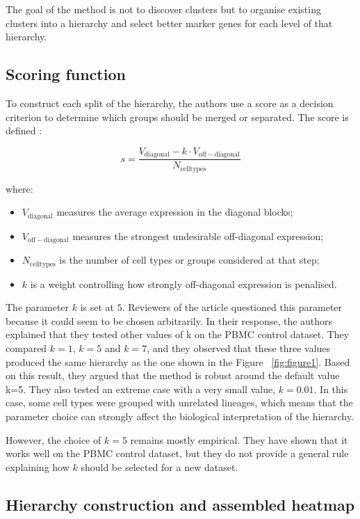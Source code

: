 \documentclass[11pt,a4paper]{article}
\begin{document}
The goal of the method is not to discover clusters but to organise existing clusters into a hierarchy and select better marker genes for each level of that hierarchy. 

\subsection{Scoring function} 

To construct each split of the hierarchy, the authors use a score as a decision criterion to determine which groups should be merged or separated. The score is defined :

\[
 s = \frac{V_{\mathrm{diagonal}} - k \cdot V_{\mathrm{off-diagonal}}}{N_{\mathrm{celltypes}}}
\]

where:

\begin{itemize}[leftmargin=1.5em]
    \item $V_{\mathrm{diagonal}}$ measures the average expression in the diagonal blocks;
    \item $V_{\mathrm{off-diagonal}}$ measures the strongest undesirable off-diagonal expression;
    \item $N_{\mathrm{celltypes}}$ is the number of cell types or groups considered at that step;
    \item $k$ is a weight controlling how strongly off-diagonal expression is penalised.
\end{itemize}

The parameter $k$ is set at $5$. Reviewers of the article questioned this parameter because it could seem to be chosen arbitrarily.
In their response, the authors explained that they tested other values of k on the PBMC control dataset.
They compared $k=1$, $k=5$ and $k=7$, and they observed that these three values produced the same hierarchy as the one shown in the Figure ~\ref{fig:figure1}.
Based on this result, they argued that the method is robust around the default value k=5.
They also tested an extreme case with a very small value, $k=0.01$.
In this case, some cell types were grouped with unrelated lineages, which means that the parameter choice can strongly affect the biological interpretation of the hierarchy.

However, the choice of $k=5$ remains mostly empirical.
They have shown that it works well on the PBMC control dataset, but they do not provide a general rule explaining how $k$ should be selected for a new dataset. 


\subsection{Hierarchy construction and assembled heatmap}
\end{document}
